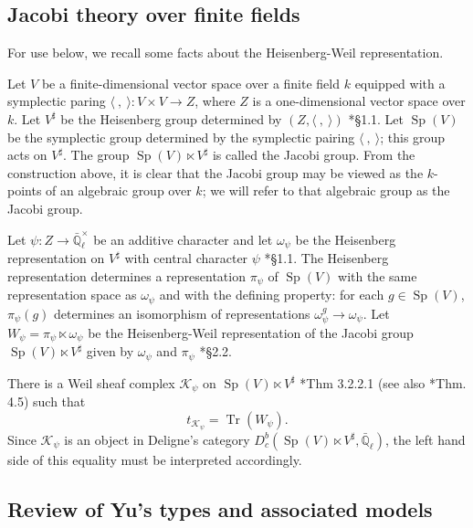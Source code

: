 \documentclass[10pt]{amsart}
\theoremstyle{plain}
\theoremstyle{definition}
\newcommand{\EE}{\mathbb{\bar Q}_\ell}
\newcommand{\Fq}{k}
\newcommand{\EEx}{\EE^\times}
\DeclareMathOperator{\trace}{Tr}
\newcommand{\trFrob}[1]{t_{#1}}
\newcommand{\cs}[1]{{\mathcal{#1}}}
\newcommand{\Sp}{{\operatorname{Sp}}}
\begin{document}
\subsection{Jacobi theory over finite fields}\label{ssec:Jacobi}

For use below, we recall some facts about the Heisenberg-Weil representation.

Let $V$ be a finite-dimensional vector space over a finite field $\Fq$ equipped with a symplectic paring $\langle\ ,\ \rangle : V\times V \to Z$, where $Z$ is a one-dimensional vector space over $\Fq$.
Let $V^\sharp$ be the Heisenberg group determined by $(Z, \langle\ ,\ \rangle)$ \cite{gurevich-hadani:07a}*{\S 1.1}.
Let $\Sp(V)$ be the symplectic group determined by the symplectic pairing $\langle\ ,\ \rangle$; this group acts on $V^\sharp$.
The group $\Sp(V)\ltimes V^\sharp$ is called the Jacobi group. 
From the construction above, it is clear that the Jacobi group may be viewed as the $\Fq$-points of an algebraic group over $\Fq$; we will refer to that algebraic group as the Jacobi group.

Let $\psi : Z \to \EEx$ be an additive character and let $\omega_\psi$ be the Heisenberg representation on $V^\sharp$ with central character $\psi$ \cite{gurevich-hadani:07a}*{\S 1.1}. 
The Heisenberg representation determines a representation $\pi_{\psi}$ of $\Sp(V)$ with the same representation space as $\omega_\psi$ and with the defining property: for each $g\in \Sp(V)$, $\pi_\psi(g)$ determines an isomorphism of representations $\omega_\psi^g \to \omega_\psi$.
Let $W_\psi = \pi_\psi \ltimes \omega_\psi$ be the Heisenberg-Weil representation of the Jacobi group $\Sp(V)\ltimes V^\sharp$ given by $\omega_\psi$ and $\pi_\psi$ \cite{gurevich-hadani:07a}*{\S 2.2}.

There is a Weil sheaf complex $\cs{K}_\psi$ on $\Sp(V)\ltimes V^\sharp$ \cite{gurevich-hadani:07a}*{Thm 3.2.2.1} (see also \cite{gurevich-hadani:11a}*{Thm. 4.5}) such that 
\begin{equation}
\trFrob{\cs{K}_\psi} = \trace(W_\psi).
\end{equation}
%
Since $\cs{K}_\psi$ is an object in Deligne's category $D^b_c(\Sp(V)\ltimes V^\sharp,\EE)$, the left hand side of this equality must be interpreted accordingly.

\subsection{Review of Yu's types and associated models}\label{ssec:review}
\end{document}
